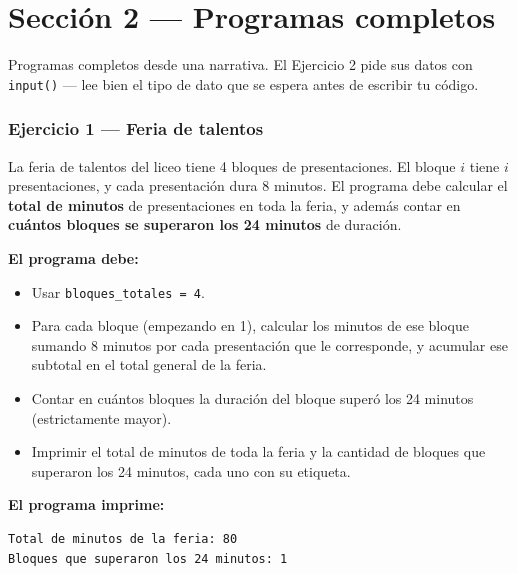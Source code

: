\documentclass[11pt]{article}
\begin{document}
\newpage
\section*{Sección 2 --- Programas completos}
Programas completos desde una narrativa. El Ejercicio 2 pide sus datos con \texttt{input()} --- lee bien el tipo de dato que se espera antes de escribir tu código.

\subsubsection*{Ejercicio 1 --- Feria de talentos}
La feria de talentos del liceo tiene 4 bloques de presentaciones. El bloque $i$ tiene $i$ presentaciones, y cada presentación dura 8 minutos. El programa debe calcular el \textbf{total de minutos} de presentaciones en toda la feria, y además contar en \textbf{cuántos bloques se superaron los 24 minutos} de duración.

\textbf{El programa debe:}
\begin{itemize}
  \item Usar \texttt{bloques\_totales = 4}.
  \item Para cada bloque (empezando en 1), calcular los minutos de ese bloque sumando 8 minutos por cada presentación que le corresponde, y acumular ese subtotal en el total general de la feria.
  \item Contar en cuántos bloques la duración del bloque superó los 24 minutos (estrictamente mayor).
  \item Imprimir el total de minutos de toda la feria y la cantidad de bloques que superaron los 24 minutos, cada uno con su etiqueta.
\end{itemize}



\vspace{1mm}\textbf{El programa imprime:}
\begin{cajacodigo}
\begin{Verbatim}[fontsize=\small]
Total de minutos de la feria: 80
Bloques que superaron los 24 minutos: 1
\end{Verbatim}
\end{cajacodigo}
\end{document}
